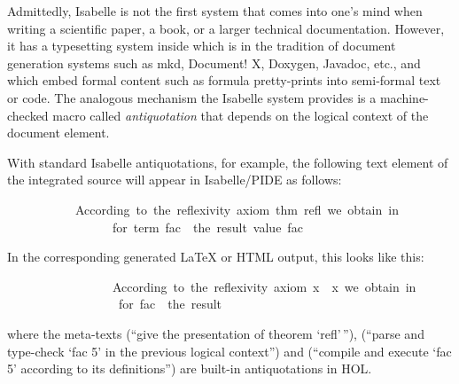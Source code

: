 \begin{isabellebody}
\begin{isamarkuptext}
Admittedly, Isabelle is not the first system that comes into one's mind when writing a scientific 
paper, a book, or a larger technical documentation. However, it has a typesetting system inside 
which is in the tradition of document generation systems such as mkd, Document! X, Doxygen, 
Javadoc, etc., and which embed formal content such as formula pretty-prints into semi-formal text 
or code. The analogous mechanism the Isabelle system provides is a machine-checked macro 
called \emph{antiquotation} that depends on the logical context of the document element.

With standard Isabelle antiquotations, for example, the following text element
of the integrated source will appear  in Isabelle/PIDE as follows:

\begin{isabelle}
\ \ \ \ \ \ \ \ \ \ \ According\ to\ the\ reflexivity\ axiom\ {\isacharat}{\kern0pt}{\isacharbraceleft}{\kern0pt}thm\ refl{\isacharbraceright}{\kern0pt}{\isacharcomma}{\kern0pt}\ we\ obtain\ in\ {\isasymGamma}\isanewline
\ \ \ \ \ \ \ \ \ \ \ \ \ \ \ \ \ for\ {\isacharat}{\kern0pt}{\isacharbraceleft}{\kern0pt}term\ {\isachardoublequote}{\kern0pt}fac\ {}{\isachardoublequote}{\kern0pt}{\isacharbraceright}{\kern0pt}\ the\ result\ {\isacharat}{\kern0pt}{\isacharbraceleft}{\kern0pt}value\ {\isachardoublequote}{\kern0pt}fac\ {}{\isachardoublequote}{\kern0pt}{\isacharbraceright}{\kern0pt}{\isachardot}{\kern0pt}{\isacartoucheclose}
\end{isabelle}
In the corresponding generated LaTeX or HTML output, this looks like this:

\begin{isabelle}
\ \ \ \ \ \ \ \ \ \ \ \ \ \ \ \ \ According\ to\ the\ reflexivity\ axiom\ {\isasymopen}x\ {\isacharequal}{\kern0pt}\ x{\isasymclose}{\isacharcomma}{\kern0pt}\ we\ obtain\ in\ {\isasymGamma}\ \isanewline
\ \ \ \ \ \ \ \ \ \ \ \ \ \ \ \ \ \ for\ {\isasymopen}fac\ {}{\isasymclose}\ the\ result\ {\isasymopen}{}{}{}{\isasymclose}{\isachardot}{\kern0pt}
\end{isabelle}
where the meta-texts  (``give the presentation of theorem `refl'\,\!''), 
 (``parse and type-check `fac 5' in the previous logical context'')
and  (``compile and execute `fac 5' according to its
definitions'') are built-in antiquotations in HOL. 


\end{isamarkuptext}
\end{isabellebody}
